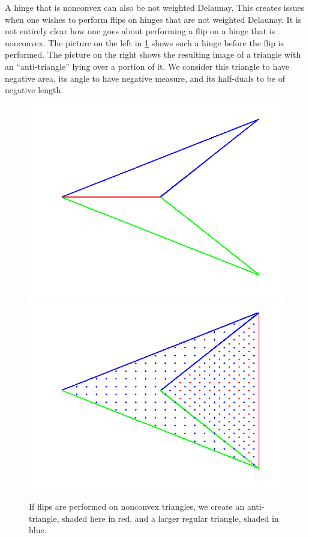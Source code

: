 \documentclass[12pt]{article}
\begin{document}
\noindent A hinge that is nonconvex can also be not weighted Delaunay. This creates issues when one wishes to perform flips on hinges that are not weighted Delaunay. It is not entirely clear how one goes about performing a flip on a hinge that is nonconvex. The picture on the left in \ref{AntiTri} shows such a hinge before the flip is performed. The picture on the right shows the resulting image of a triangle with an ``anti-triangle'' lying over a portion of it. We consider this triangle to have negative area, its angle to have negative measure, and its half-duals to be of negative length.\newline

\begin{figure}
\label{antitri}
\centering
\includegraphics[scale = 0.4]{Pictures/antitri1.png}
\includegraphics[scale = 0.4]{Pictures/antitri2.png}
\caption{If flips are performed on nonconvex triangles, we create an anti-triangle, shaded here in red, and a larger regular triangle, shaded in blue.}
\label{AntiTri}
\end{figure}
\end{document}
